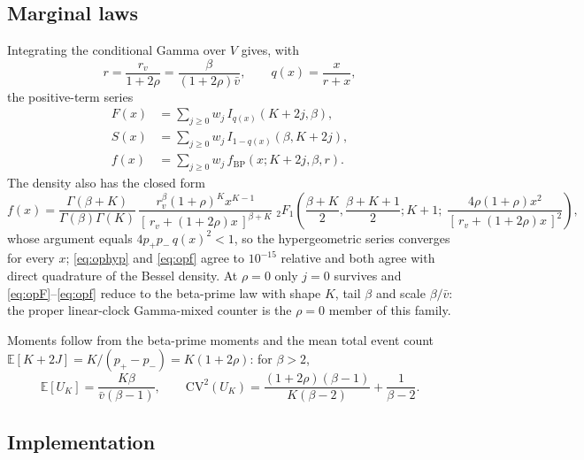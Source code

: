 \documentclass[11pt]{article}
\newcommand{\E}{\mathbb{E}}
\newcommand{\Ireg}{I}
\begin{document}
\subsection{Marginal laws}
Integrating the conditional Gamma over $V$ gives, with
\begin{equation}
r=\frac{r_v}{1+2\rho}=\frac{\beta}{(1+2\rho)\bar v},\qquad q(x)=\frac{x}{r+x},
\end{equation}
the positive-term series
\begin{align}
F(x)&=\sum_{j\ge0}w_j\,\Ireg_{q(x)}(K+2j,\beta),
\label{eq:opF}\\
S(x)&=\sum_{j\ge0}w_j\,\Ireg_{1-q(x)}(\beta,K+2j),
\label{eq:opS}\\
f(x)&=\sum_{j\ge0}w_j\,f_{\mathrm{BP}}(x;K+2j,\beta,r).
\label{eq:opf}
\end{align}
The density also has the closed form
\begin{equation}
f(x)=\frac{\Gamma(\beta+K)}{\Gamma(\beta)\Gamma(K)}\,
\frac{r_v^{\beta}(1+\rho)^{K}x^{K-1}}{[\,r_v+(1+2\rho)x\,]^{\beta+K}}\;
{}_2F_1\!\left(\frac{\beta+K}{2},\frac{\beta+K+1}{2};K+1;\;\frac{4\rho(1+\rho)x^2}{[\,r_v+(1+2\rho)x\,]^2}\right),
\label{eq:ophyp}
\end{equation}
whose argument equals $4p_+p_-\,q(x)^2<1$, so the hypergeometric series converges for every $x$; \eqref{eq:ophyp} and \eqref{eq:opf} agree to $10^{-15}$ relative and both agree with direct quadrature of the Bessel density. At $\rho=0$ only $j=0$ survives and \eqref{eq:opF}--\eqref{eq:opf} reduce to the beta-prime law with shape $K$, tail $\beta$ and scale $\beta/\bar v$: the proper linear-clock Gamma-mixed counter is the $\rho=0$ member of this family.

Moments follow from the beta-prime moments and the mean total event count $\E[K+2J]=K/(p_+-p_-)=K(1+2\rho)$: for $\beta>2$,
\begin{equation}
\E[U_K]=\frac{K\beta}{\bar v(\beta-1)},\qquad
\mathrm{CV}^2(U_K)=\frac{(1+2\rho)(\beta-1)}{K(\beta-2)}+\frac{1}{\beta-2}.
\end{equation}

\subsection{Implementation}
\end{document}
